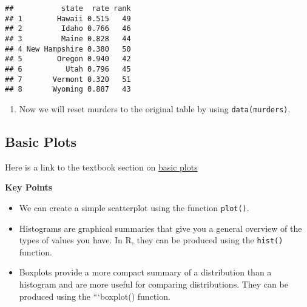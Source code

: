 \documentclass[]{article}
\newenvironment{Shaded}{\begin{snugshade}}{\end{snugshade}}
\newcommand{\CommentTok}[1]{\textcolor[rgb]{0.56,0.35,0.01}{\textit{#1}}}
\newcommand{\DataTypeTok}[1]{\textcolor[rgb]{0.13,0.29,0.53}{#1}}
\newcommand{\DecValTok}[1]{\textcolor[rgb]{0.00,0.00,0.81}{#1}}
\newcommand{\KeywordTok}[1]{\textcolor[rgb]{0.13,0.29,0.53}{\textbf{#1}}}
\newcommand{\NormalTok}[1]{#1}
\newcommand{\OperatorTok}[1]{\textcolor[rgb]{0.81,0.36,0.00}{\textbf{#1}}}
\newcommand{\StringTok}[1]{\textcolor[rgb]{0.31,0.60,0.02}{#1}}
\providecommand{\tightlist}{%
  \setlength{\itemsep}{0pt}\setlength{\parskip}{0pt}}
\begin{document}
\begin{verbatim}
##           state  rate rank
## 1        Hawaii 0.515   49
## 2         Idaho 0.766   46
## 3         Maine 0.828   44
## 4 New Hampshire 0.380   50
## 5        Oregon 0.940   42
## 6          Utah 0.796   45
## 7       Vermont 0.320   51
## 8       Wyoming 0.887   43
\end{verbatim}

\begin{enumerate}
\def\labelenumi{\arabic{enumi}.}
\setcounter{enumi}{8}
\tightlist
\item
  Now we will reset murders to the original table by using
  \texttt{data(murders)}.
\end{enumerate}

\begin{Shaded}
\end{Shaded}

\hypertarget{basic-plots}{%
\subsection{Basic Plots}\label{basic-plots}}

Here is a link to the textbook section on
\href{https://rafalab.github.io/dsbook/r-basics.html\#basic-plots}{basic
plots}

\textbf{Key Points}

\begin{itemize}
\tightlist
\item
  We can create a simple scatterplot using the function \texttt{plot()}.
\item
  Histograms are graphical summaries that give you a general overview of
  the types of values you have. In R, they can be produced using the
  \texttt{hist()} function.
\item
  Boxplots provide a more compact summary of a distribution than a
  histogram and are more useful for comparing distributions. They can be
  produced using the ```boxplot() function.
\end{itemize}
\end{document}
